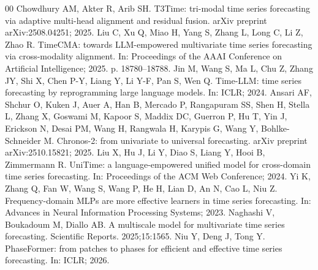 \documentclass[a4paper,fleqn]{cas-sc}
\begin{document}
\begin{thebibliography}{00}
 Chowdhury AM, Akter R, Arib SH. T3Time: tri-modal time series forecasting via adaptive multi-head alignment and residual fusion. arXiv preprint arXiv:2508.04251; 2025.
 Liu C, Xu Q, Miao H, Yang S, Zhang L, Long C, Li Z, Zhao R. TimeCMA: towards LLM-empowered multivariate time series forecasting via cross-modality alignment. In: Proceedings of the AAAI Conference on Artificial Intelligence; 2025. p. 18780--18788.
 Jin M, Wang S, Ma L, Chu Z, Zhang JY, Shi X, Chen P-Y, Liang Y, Li Y-F, Pan S, Wen Q. Time-LLM: time series forecasting by reprogramming large language models. In: ICLR; 2024.
 Ansari AF, Shchur O, Kuken J, Auer A, Han B, Mercado P, Rangapuram SS, Shen H, Stella L, Zhang X, Goswami M, Kapoor S, Maddix DC, Guerron P, Hu T, Yin J, Erickson N, Desai PM, Wang H, Rangwala H, Karypis G, Wang Y, Bohlke-Schneider M. Chronos-2: from univariate to universal forecasting. arXiv preprint arXiv:2510.15821; 2025.
 Liu X, Hu J, Li Y, Diao S, Liang Y, Hooi B, Zimmermann R. UniTime: a language-empowered unified model for cross-domain time series forecasting. In: Proceedings of the ACM Web Conference; 2024.
 Yi K, Zhang Q, Fan W, Wang S, Wang P, He H, Lian D, An N, Cao L, Niu Z. Frequency-domain MLPs are more effective learners in time series forecasting. In: Advances in Neural Information Processing Systems; 2023.
 Naghashi V, Boukadoum M, Diallo AB. A multiscale model for multivariate time series forecasting. Scientific Reports. 2025;15:1565.
 Niu Y, Deng J, Tong Y. PhaseFormer: from patches to phases for efficient and effective time series forecasting. In: ICLR; 2026.
\end{thebibliography}
\end{document}
